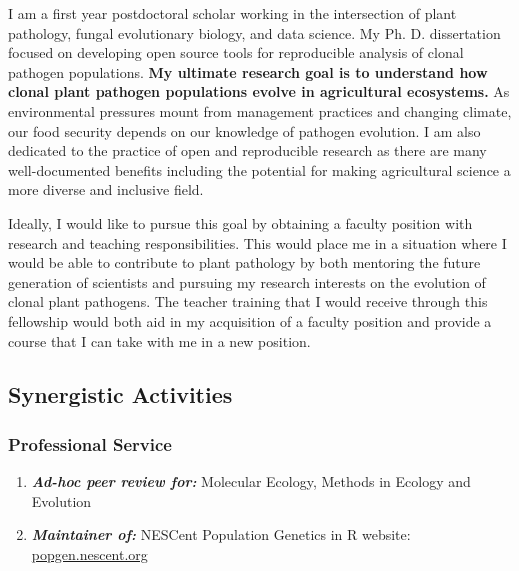 \documentclass[12pt,letterpaper]{article}
\begin{document}

I am a first year postdoctoral scholar working in the intersection of plant pathology, fungal evolutionary biology, and data science. My Ph. D. dissertation focused on developing open source tools for reproducible analysis of clonal pathogen populations. 
\textbf{My ultimate research goal is to understand how clonal plant pathogen populations evolve in agricultural ecosystems.}
As environmental pressures mount from management practices and changing climate, our food security depends on our knowledge of pathogen evolution.
I am also dedicated to the practice of open and reproducible research as there are many well-documented benefits including the potential for making agricultural science a more diverse and inclusive field.

Ideally, I would like to pursue this goal by obtaining a faculty position with
research and teaching responsibilities. 
This would place me in a situation where I would be able to contribute to plant pathology by both mentoring the future generation of scientists and pursuing my research interests on the evolution of clonal plant pathogens.
The teacher training that I would receive through this fellowship would both aid in my acquisition of a faculty position and provide a course that I can take
with me in a new position.

\subsection*{Synergistic Activities}

\subsubsection*{Professional Service}
\begin{enumerate}
	
	\item \textit{\textbf{Ad-hoc peer review for:}} Molecular Ecology, Methods in Ecology and Evolution
	\item \textit{\textbf{Maintainer of:}} NESCent Population Genetics in R  website: 
                                 \href{http://popgen.nescent.org}{popgen.nescent.org}
\end{enumerate}
\end{document}
